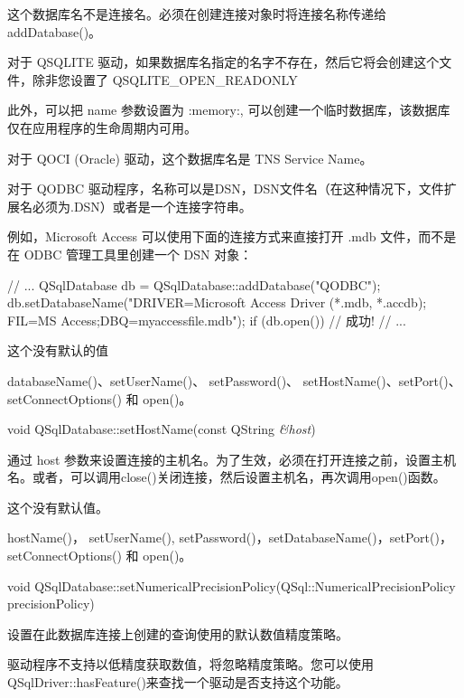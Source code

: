 \begin{notice}
这个数据库名不是连接名。必须在创建连接对象时将连接名称传递给 addDatabase()。
\end{notice}


对于 QSQLITE 驱动，如果数据库名指定的名字不存在，然后它将会创建这个文件，除非您设置了 QSQLITE\_OPEN\_READONLY

此外，可以把 name 参数设置为 :memory:, 可以创建一个临时数据库，该数据库仅在应用程序的生命周期内可用。

对于 QOCI (Oracle) 驱动，这个数据库名是 TNS Service Name。

对于 QODBC 驱动程序，名称可以是DSN，DSN文件名（在这种情况下，文件扩展名必须为.DSN）或者是一个连接字符串。

例如，Microsoft Access 可以使用下面的连接方式来直接打开 .mdb 文件，而不是在 ODBC 管理工具里创建一个 DSN 对象：

\clearpage

\begin{cppcode}
// ...
QSqlDatabase db = QSqlDatabase::addDatabase("QODBC");
db.setDatabaseName("DRIVER={Microsoft Access Driver (*.mdb, *.accdb)};
FIL={MS Access};DBQ=myaccessfile.mdb");
if (db.open()) {
	// 成功!
}
// ...
\end{cppcode}

这个没有默认的值

\begin{seeAlso}
databaseName()、setUserName()、 setPassword()、 setHostName()、setPort()、setConnectOptions() 和 open()。
\end{seeAlso}


void QSqlDatabase::setHostName(const QString \emph{\&host})

通过 host 参数来设置连接的主机名。为了生效，必须在打开连接之前，设置主机名。或者，可以调用close()关闭连接，然后设置主机名，再次调用open()函数。

这个没有默认值。

\begin{seeAlso}
hostName()， setUserName(), setPassword()，setDatabaseName()，setPort()， setConnectOptions() 和 open()。
\end{seeAlso}


void QSqlDatabase::setNumericalPrecisionPolicy(QSql::NumericalPrecisionPolicy precisionPolicy)


设置在此数据库连接上创建的查询使用的默认数值精度策略。

\begin{notice}
驱动程序不支持以低精度获取数值，将忽略精度策略。您可以使用 QSqlDriver::hasFeature()来查找一个驱动是否支持这个功能。
\end{notice}

